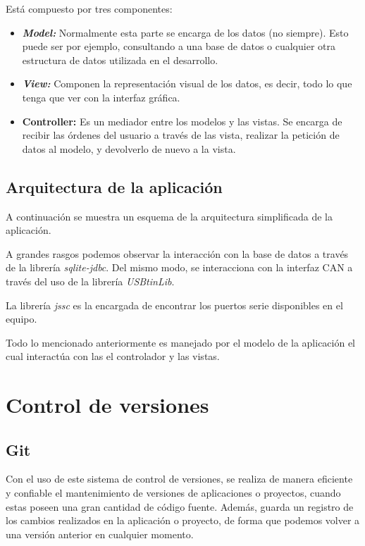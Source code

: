 Está compuesto por tres componentes:
\begin{itemize}
\item
\textit{\textbf{Model: }} Normalmente esta parte se encarga de los datos (no siempre). Esto puede ser por ejemplo, consultando a una base de datos o cualquier otra estructura de datos utilizada en el desarrollo.
\item
\textit{\textbf{View: }} Componen la representación visual de los datos, es decir, todo lo que tenga que ver con la interfaz gráfica.
\item
\textbf{\textbf{Controller: }} Es un mediador entre los modelos y las vistas. Se encarga de recibir las órdenes del usuario a través de las vista, realizar la petición de datos al modelo, y devolverlo de nuevo a la vista.
\end{itemize}

\newpage
\subsection{Arquitectura de la aplicación}\label{arquitectura_app}

A continuación se muestra un esquema de la arquitectura simplificada de la aplicación.


A grandes rasgos podemos observar la interacción con la base de datos a través de la librería \emph{sqlite-jdbc}. Del mismo modo, se interacciona con la interfaz CAN a través del uso de la librería \emph{USBtinLib}.

La librería \emph{jssc} es la encargada de encontrar los puertos serie disponibles en el equipo.

Todo lo mencionado anteriormente es manejado por el modelo de la aplicación el cual interactúa con las el controlador y las vistas.

\section{Control de versiones}\label{control_de_versiones}

\subsection{Git}\label{git}

Con el uso de este sistema de control de versiones, se realiza de manera eficiente y confiable el mantenimiento de versiones de aplicaciones o proyectos, cuando estas poseen una gran cantidad de código fuente. Además, guarda un registro de los cambios realizados en la aplicación o proyecto, de forma que podemos volver a una versión anterior en cualquier momento.

